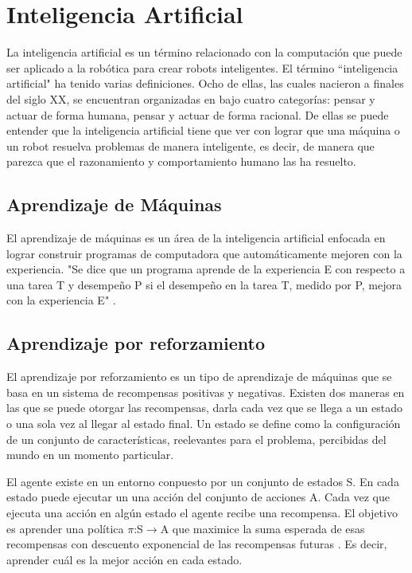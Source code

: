 \section{Inteligencia Artificial} \label{sect:Inteligencia_Artificial}
La inteligencia artificial es un término relacionado con la computación que puede ser aplicado a la robótica para crear robots inteligentes. El término ``inteligencia artificial"\:
 ha tenido varias definiciones. Ocho de ellas, las cuales nacieron a finales del siglo XX, se encuentran organizadas en \cite{peterNorvig} bajo cuatro categorías: pensar y actuar de forma humana, pensar y actuar de forma racional. De ellas se puede entender que la inteligencia artificial tiene que ver con lograr que una máquina o un robot resuelva problemas de manera inteligente, es decir, de manera que parezca que el razonamiento y comportamiento humano las ha resuelto.  

\subsection{Aprendizaje de Máquinas}

El aprendizaje de máquinas es un área de la inteligencia artificial enfocada en lograr construir programas de computadora que automáticamente mejoren con la experiencia. "Se dice que un programa aprende de la experiencia E con respecto a una tarea T y desempeño P si el desempeño en la tarea T, medido por P, mejora con la experiencia E"  \cite{Mitchell}.

\subsection{Aprendizaje por reforzamiento}
El aprendizaje por reforzamiento es un tipo de aprendizaje de máquinas que se basa en un sistema de recompensas positivas y negativas. Existen dos maneras en las que se puede otorgar las recompensas, darla cada vez que se llega a un estado o una sola vez al llegar al estado final. Un estado se define como la configuraci\'on de un conjunto de características, reelevantes para el problema, percibidas del mundo en un momento particular.

El agente existe en un entorno conpuesto por un conjunto de estados S. En cada estado puede ejecutar un una acción del conjunto de acciones A. Cada vez que ejecuta una acción en algún estado el agente recibe una recompensa. El objetivo es aprender una política $\pi$:S$\to$A que maximice la suma esperada de esas recompensas con descuento exponencial de las recompensas futuras \cite{Mitchell}. Es decir, aprender cuál es la mejor acción en cada estado.

